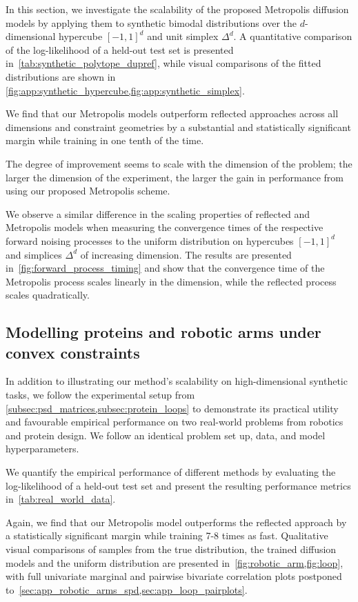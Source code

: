In this section, we investigate the scalability of the proposed Metropolis diffusion models by applying them to synthetic bimodal distributions over the \(d\)-dimensional hypercube \([-1, 1]^d\) and unit simplex \(\Delta^{d}\).
A quantitative comparison of the log-likelihood of a held-out test set is presented in~\cref{tab:synthetic_polytope_dupref}, while visual comparisons of the fitted distributions are shown in \cref{fig:app:synthetic_hypercube,fig:app:synthetic_simplex}.

We find that our Metropolis models outperform reflected approaches across all dimensions and constraint geometries by a substantial and statistically significant margin while training in one tenth of the time.

The degree of improvement seems to scale with the dimension of the problem; the larger the dimension of the experiment, the larger the gain in performance from using our proposed Metropolis scheme.

We observe a similar difference in the scaling properties of reflected and Metropolis models when measuring the convergence times of the respective forward noising processes to the uniform distribution on hypercubes \([-1, 1]^d\) and simplices \(\Delta^{d}\) of increasing dimension. The results are presented in~\cref{fig:forward_process_timing} and show that the convergence time of the Metropolis process scales linearly in the dimension, while the reflected process scales quadratically.

\subsection{Modelling proteins and robotic arms under convex constraints}
\label{sec:exp_arms_and_backbones}

In addition to illustrating our method's scalability on high-dimensional synthetic tasks, we follow the experimental setup from  \cref{subsec:psd_matrices,subsec:protein_loops} to demonstrate its practical utility and favourable empirical performance on two real-world problems from robotics and protein design.
We follow an identical problem set up, data, and model hyperparameters.

We quantify the empirical performance of different methods by evaluating the log-likelihood of a held-out test set and present the resulting performance metrics in~\cref{tab:real_world_data}.

Again, we find that our Metropolis model outperforms the reflected approach by a statistically significant margin while training 7-8 times as fast.
Qualitative visual comparisons of samples from the true distribution, the trained diffusion models and the uniform distribution are presented in~\cref{fig:robotic_arm,fig:loop}, with full univariate marginal and pairwise bivariate correlation plots postponed to~\cref{sec:app_robotic_arms_spd,sec:app_loop_pairplots}.


